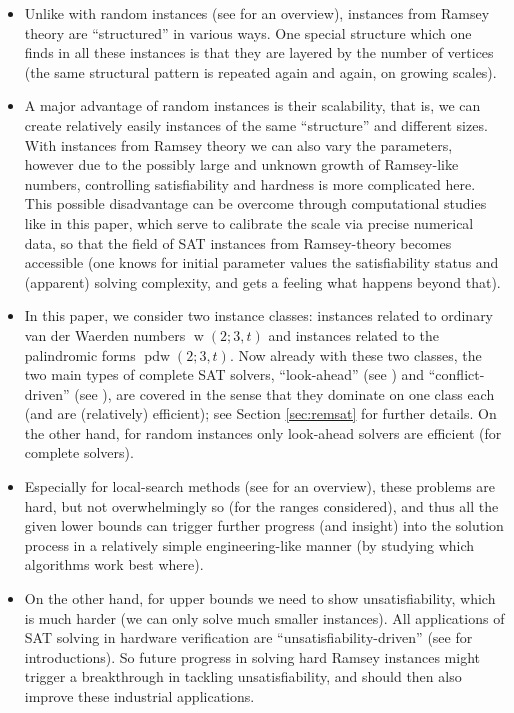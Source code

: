 \documentclass[final,3p,times]{elsarticle}
\theoremstyle{definition}
\DeclareMathOperator{\vdw}{w}
\DeclareMathOperator{\vdwpd}{pdw}
\begin{document}
\begin{itemize}
\item Unlike with random instances (see \cite{Ach09HBSAT} for an overview), instances from Ramsey theory are ``structured'' in various ways. One special structure which one finds in all these instances is that they are layered by the number of vertices (the same structural pattern is repeated again and again, on growing scales).
\item A major advantage of random instances is their scalability, that is, we can create relatively easily instances of the same ``structure'' and different sizes. With instances from Ramsey theory we can also vary the parameters, however due to the possibly large and unknown growth of Ramsey-like numbers, controlling satisfiability and hardness is more complicated here. This possible disadvantage can be overcome through computational studies like in this paper,
which serve to calibrate the scale via precise numerical data, so that the field of SAT instances from Ramsey-theory becomes accessible (one knows for initial parameter values the satisfiability status and (apparent) solving complexity, and gets a feeling what happens beyond that).
\item In this paper, we consider two instance classes: instances related to ordinary van der Waerden numbers $\vdw(2;3,t)$
and instances related to the palindromic forms $\vdwpd(2;3,t)$. Now already with these two classes, the two main types of complete
SAT solvers, ``look-ahead'' (see \cite{HvM09HBSAT}) and ``conflict-driven'' (see \cite{MSLM09HBSAT}), are covered in the
sense that they dominate on one class each (and are (relatively) efficient); see Section \ref{sec:remsat} for further details.
On the other hand, for random instances only look-ahead solvers are efficient (for complete solvers).
\item Especially for local-search methods (see \cite{KSS09HBSAT} for an overview), these problems are hard,
but not overwhelmingly so (for the ranges considered), and thus all the given lower bounds can trigger further progress
(and insight) into the solution process in a relatively simple engineering-like manner (by studying which algorithms work best where).
\item On the other hand, for upper bounds we need to show unsatisfiability, which is much harder (we can only solve much smaller instances). All applications of SAT solving
in hardware verification are ``unsatisfiability-driven'' (see \cite{Bie09HBSAT,Kro09HBSAT} for introductions). So future progress
in solving hard Ramsey instances might trigger a breakthrough in tackling unsatisfiability,
and should then also improve these industrial applications.
\end{itemize}
\end{document}
